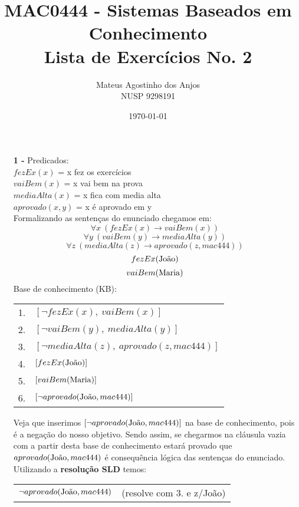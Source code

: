 \documentclass[12pt]{article}
\title{MAC0444 - Sistemas Baseados em Conhecimento \\
Lista de Exercícios No. 2
}
\author{Mateus Agostinho dos Anjos\\NUSP 9298191}
\date{\today}
\begin{document}
	\maketitle
	\begin{itemize}
		\item[\textbf{1 -}]
			\hfill\newline
			Predicados:\\
			$fezEx(x)$ = x fez os exercícios\\
			$vaiBem(x)$ = x vai bem na prova\\
			$mediaAlta(x)$ = x fica com media alta\\
			$aprovado(x, y)$ = x é aprovado em y \\
			\newline
			Formalizando as sentenças do enunciado chegamos em:\\
			$$\forall x \ (fezEx(x) \rightarrow vaiBem(x))$$
			$$\forall y \ (vaiBem(y) \rightarrow mediaAlta(y))$$
			$$\forall z \ (mediaAlta(z) \rightarrow aprovado(z, mac444))$$
			$$fezEx(\textnormal{João})$$
			$$vaiBem(\textnormal{Maria})$$
			Base de conhecimento (KB):\\
			\begin{center}
				\begin{tabular}{c l}
				1. & $[\neg fezEx(x), \ vaiBem(x)]$\\
				2. & $[\neg vaiBem(y), \ mediaAlta(y)]$\\
				3. & $[\neg mediaAlta(z), \ aprovado(z, mac444)] $\\
				4. & $[fezEx(\textnormal{João})]$\\
				5. & $[vaiBem(\textnormal{Maria})]$\\
				6. & $[\neg aprovado(\textnormal{João}, mac444)]$\\
				\end{tabular}
			\end{center}
			Veja que inserimos $[\neg aprovado(\textnormal{João}, mac444)]$ na base de 
			conhecimento, pois	é a negação do nosso objetivo. Sendo assim, se chegarmos na 
			cláusula vazia com a partir desta base de conhecimento estará provado que 
			$aprovado(\textnormal{João}, mac444)$ é consequência lógica das sentenças do
			 enunciado.\\
			\newline
			Utilizando a \textbf{resolução SLD} temos:\\
			\begin{center}
				\begin{tabular}{c c}
					$\neg aprovado(\textnormal{João}, mac444)$ & (resolve com 3. e z/João)\\

\end{tabular}
\end{center}
\end{itemize}
\end{document}
